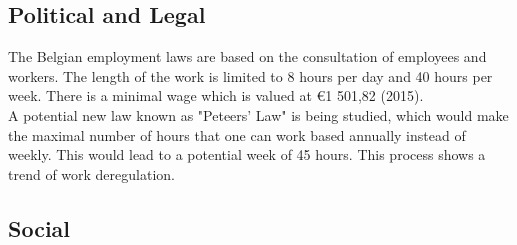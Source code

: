 \documentclass[12pt,a4paper,oneside]{book}
\begin{document}
\subsection{Political and Legal}


The Belgian employment laws are based on the consultation of employees and workers. The length of the work is limited to 8 hours per day and 40 hours per week. There is a minimal wage which is valued at \euro 1 501,82 (2015)\cite{eurostatmw}.\\
A potential new law known as "Peteers' Law" is being studied, which would make the maximal number of hours that one can work based annually instead of weekly. This would lead to a potential week of 45 hours.\cite{rtlp} This process shows a trend of work deregulation.\\


\subsection{Social}
\end{document}
